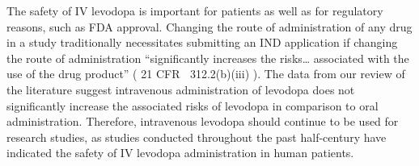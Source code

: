 The safety of IV levodopa is important for patients as well as for regulatory reasons, such as FDA approval.  Changing the route of administration of any drug in a study traditionally necessitates submitting an IND application if changing the route of administration “significantly increases the risks… associated with the use of the drug product” ( 21 CFR 312.2(b)(iii) ).  The data from our review of the literature suggest intravenous administration of levodopa does not significantly increase the associated risks of levodopa in comparison to oral administration.  Therefore, intravenous levodopa should continue to be used for research studies, as studies conducted throughout the past half-century have indicated the safety of IV levodopa administration in human patients.
					
